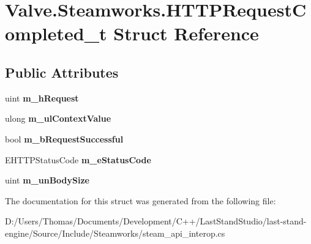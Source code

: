 \hypertarget{structValve_1_1Steamworks_1_1HTTPRequestCompleted__t}{}\section{Valve.\+Steamworks.\+H\+T\+T\+P\+Request\+Completed\+\_\+t Struct Reference}
\label{structValve_1_1Steamworks_1_1HTTPRequestCompleted__t}
\subsection*{Public Attributes}
\begin{DoxyCompactItemize}
\item 
\hypertarget{structValve_1_1Steamworks_1_1HTTPRequestCompleted__t_ae0963058487572e9200642667772dfdf}{}uint {\bfseries m\+\_\+h\+Request}\label{structValve_1_1Steamworks_1_1HTTPRequestCompleted__t_ae0963058487572e9200642667772dfdf}

\item 
\hypertarget{structValve_1_1Steamworks_1_1HTTPRequestCompleted__t_a7b575ecd2f3d2cd9f58b423782f46395}{}ulong {\bfseries m\+\_\+ul\+Context\+Value}\label{structValve_1_1Steamworks_1_1HTTPRequestCompleted__t_a7b575ecd2f3d2cd9f58b423782f46395}

\item 
\hypertarget{structValve_1_1Steamworks_1_1HTTPRequestCompleted__t_a49ca5fd27bab2fba6837bb70ccb6bca1}{}bool {\bfseries m\+\_\+b\+Request\+Successful}\label{structValve_1_1Steamworks_1_1HTTPRequestCompleted__t_a49ca5fd27bab2fba6837bb70ccb6bca1}

\item 
\hypertarget{structValve_1_1Steamworks_1_1HTTPRequestCompleted__t_aeaff54a1ea0a44b0e5faa0eeff59d601}{}E\+H\+T\+T\+P\+Status\+Code {\bfseries m\+\_\+e\+Status\+Code}\label{structValve_1_1Steamworks_1_1HTTPRequestCompleted__t_aeaff54a1ea0a44b0e5faa0eeff59d601}

\item 
\hypertarget{structValve_1_1Steamworks_1_1HTTPRequestCompleted__t_accd2a94e999addf02151483dd6761ab5}{}uint {\bfseries m\+\_\+un\+Body\+Size}\label{structValve_1_1Steamworks_1_1HTTPRequestCompleted__t_accd2a94e999addf02151483dd6761ab5}

\end{DoxyCompactItemize}


The documentation for this struct was generated from the following file\+:\begin{DoxyCompactItemize}
\item 
D\+:/\+Users/\+Thomas/\+Documents/\+Development/\+C++/\+Last\+Stand\+Studio/last-\/stand-\/engine/\+Source/\+Include/\+Steamworks/steam\+\_\+api\+\_\+interop.\+cs\end{DoxyCompactItemize}

